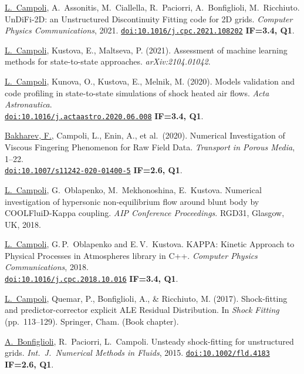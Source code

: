 \documentclass[11pt,a4paper]{article}
\begin{document}
\underline{L.\ Campoli}, A.\ Assonitis, M.\ Ciallella, R.\ Paciorri, A.\ Bonfiglioli,
M.\ Ricchiuto. UnDiFi-2D: an Unstructured Discontinuity Fitting code for 2D grids.
\textit{Computer Physics Communications}, 2021.
\href{https://doi.org/10.1016/j.cpc.2021.108202}{\texttt{doi:10.1016/j.cpc.2021.108202}}
\textbf{IF=3.4, Q1}.

\smallskip
\underline{L.\ Campoli}, Kustova, E., Maltseva, P. (2021). Assessment of machine learning
methods for state-to-state approaches. \textit{arXiv:2104.01042}.

\smallskip
\underline{L.\ Campoli}, Kunova, O., Kustova, E., Melnik, M. (2020). Models validation
and code profiling in state-to-state simulations of shock heated air flows.
\textit{Acta Astronautica}.\\
\href{https://doi.org/10.1016/j.actaastro.2020.06.008}{\texttt{doi:10.1016/j.actaastro.2020.06.008}}
\textbf{IF=3.4, Q1}.

\smallskip
\underline{Bakharev, F.}, Campoli, L., Enin, A., et al.\ (2020). Numerical Investigation
of Viscous Fingering Phenomenon for Raw Field Data.
\textit{Transport in Porous Media}, 1--22. \\
\href{https://doi.org/10.1007/s11242-020-01400-5}{\texttt{doi:10.1007/s11242-020-01400-5}}
\textbf{IF=2.6, Q1}.

\smallskip
\underline{L.\ Campoli}, G.\ Oblapenko, M.\ Mekhonoshina, E.\ Kustova. Numerical
investigation of hypersonic non-equilibrium flow around blunt body by COOLFluiD-Kappa coupling. \textit{AIP Conference Proceedings}. RGD31, Glasgow, UK, 2018.

\smallskip
\underline{L.\ Campoli}, G.\,P.\ Oblapenko and E.\,V.\ Kustova. KAPPA: Kinetic Approach
to Physical Processes in Atmospheres library in C++.
\textit{Computer Physics Communications}, 2018. \\
\href{https://doi.org/10.1016/j.cpc.2018.10.016}{\texttt{doi:10.1016/j.cpc.2018.10.016}}
\textbf{IF=3.4, Q1}.

\smallskip
\underline{L.\ Campoli}, Quemar, P., Bonfiglioli, A., \& Ricchiuto, M. (2017).
Shock-fitting and predictor-corrector explicit ALE Residual Distribution.
In \textit{Shock Fitting} (pp.\ 113--129). Springer, Cham. (Book chapter).

\smallskip
\underline{A.\ Bonfiglioli}, R.\ Paciorri, L.\ Campoli. Unsteady shock-fitting for
unstructured grids. \textit{Int.\ J.\ Numerical Methods in Fluids}, 2015.
\href{https://doi.org/10.1002/fld.4183}{\texttt{doi:10.1002/fld.4183}}
\textbf{IF=2.6, Q1}.
\end{document}
